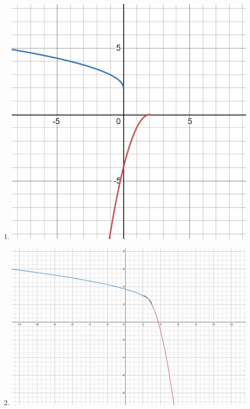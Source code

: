 \documentclass{ximera}
\begin{document}
\begin{exercise}
\begin{enumerate}
\begin{image}
\end{image}
\item
\begin{image}
\includegraphics[width=.7\textwidth]{IFR10d.png}
\end{image}
\item
\begin{image}
\includegraphics[width=.7\textwidth]{IFR10e.png}
\end{image}
\end{enumerate}
\begin{selectAll}

\end{selectAll}
\end{exercise}
\end{document}
